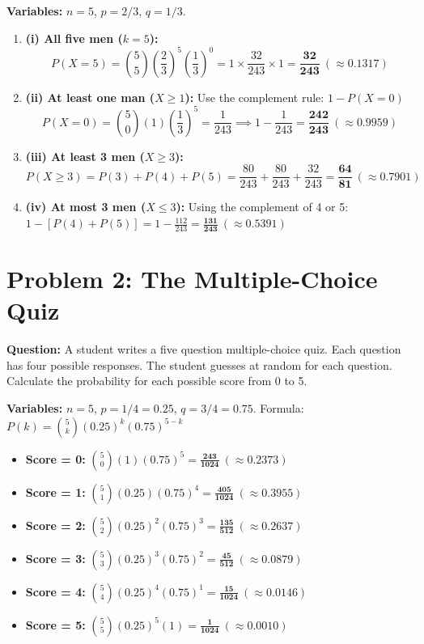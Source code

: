 \documentclass[11pt,a4paper]{article}
\begin{document}
\noindent\textbf{Variables:} $n = 5$, $p = 2/3$, $q = 1/3$.

\begin{enumerate}
    \item \textbf{(i) All five men ($k = 5$):}
    $$P(X = 5) = \binom{5}{5} \left(\frac{2}{3}\right)^5 \left(\frac{1}{3}\right)^0 = 1 \times \frac{32}{243} \times 1 = \mathbf{\frac{32}{243}} \ (\approx 0.1317)$$
    
    \item \textbf{(ii) At least one man ($X \ge 1$):}
    Use the complement rule: $1 - P(X = 0)$
    $$P(X = 0) = \binom{5}{0} (1)(\frac{1}{3})^5 = \frac{1}{243} \implies 1 - \frac{1}{243} = \mathbf{\frac{242}{243}} \ (\approx 0.9959)$$
    
    \item \textbf{(iii) At least 3 men ($X \ge 3$):}
    $$P(X \ge 3) = P(3) + P(4) + P(5) = \frac{80}{243} + \frac{80}{243} + \frac{32}{243} = \mathbf{\frac{64}{81}} \ (\approx 0.7901)$$
    
    \item \textbf{(iv) At most 3 men ($X \le 3$):}
    Using the complement of 4 or 5: $1 - [P(4) + P(5)] = 1 - \frac{112}{243} = \mathbf{\frac{131}{243}} \ (\approx 0.5391)$
\end{enumerate}

\section*{Problem 2: The Multiple-Choice Quiz}
\textbf{Question:} A student writes a five question multiple-choice quiz. Each question has four possible responses. The student guesses at random for each question. Calculate the probability for each possible score from 0 to 5.

\noindent\textbf{Variables:} $n = 5$, $p = 1/4 = 0.25$, $q = 3/4 = 0.75$. Formula: $P(k) = \binom{5}{k} (0.25)^k (0.75)^{5-k}$

\begin{itemize}
    \item \textbf{Score = 0:} $\binom{5}{0}(1)(0.75)^5 = \mathbf{\frac{243}{1024}} \ (\approx 0.2373)$
    \item \textbf{Score = 1:} $\binom{5}{1}(0.25)(0.75)^4 = \mathbf{\frac{405}{1024}} \ (\approx 0.3955)$
    \item \textbf{Score = 2:} $\binom{5}{2}(0.25)^2(0.75)^3 = \mathbf{\frac{135}{512}} \ (\approx 0.2637)$
    \item \textbf{Score = 3:} $\binom{5}{3}(0.25)^3(0.75)^2 = \mathbf{\frac{45}{512}} \ (\approx 0.0879)$
    \item \textbf{Score = 4:} $\binom{5}{4}(0.25)^4(0.75)^1 = \mathbf{\frac{15}{1024}} \ (\approx 0.0146)$
    \item \textbf{Score = 5:} $\binom{5}{5}(0.25)^5(1) = \mathbf{\frac{1}{1024}} \ (\approx 0.0010)$
\end{itemize}
\end{document}
